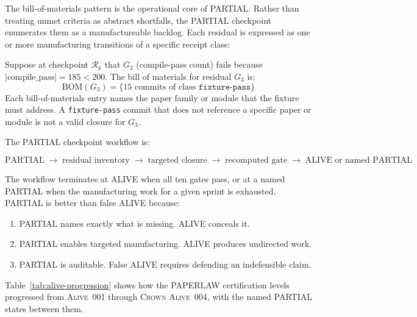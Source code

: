 The bill-of-materials pattern is the operational core of PARTIAL. Rather than treating
unmet criteria as abstract shortfalls, the PARTIAL checkpoint enumerates them as a
manufactureable backlog. Each residual is expressed as one or more manufacturing
transitions of a specific receipt class:

\begin{example}
\label{ex:partial-bom}
Suppose at checkpoint $\mathcal{R}_k$ that $G_3$ (compile-pass count) fails because
$|\text{compile\_pass}| = 185 < 200$. The bill of materials for residual $G_3$ is:
\[
  \text{BOM}(G_3) = \{15 \text{ commits of class } \texttt{fixture-pass}\}
\]
Each bill-of-materials entry names the paper family or module that the fixture must
address. A \texttt{fixture-pass} commit that does not reference a specific paper or
module is not a valid closure for $G_3$.
\end{example}

The PARTIAL checkpoint workflow is:

\[
  \text{PARTIAL} \;\to\; \text{residual inventory} \;\to\; \text{targeted closure}
  \;\to\; \text{recomputed gate} \;\to\; \text{ALIVE} \;\text{or named PARTIAL}
\]

The workflow terminates at ALIVE when all ten gates pass, or at a named PARTIAL when the
manufacturing work for a given sprint is exhausted. PARTIAL is better than false ALIVE
because:

\begin{enumerate}
  \item PARTIAL names exactly what is missing. ALIVE conceals it.
  \item PARTIAL enables targeted manufacturing. ALIVE produces undirected work.
  \item PARTIAL is auditable. False ALIVE requires defending an indefensible claim.
\end{enumerate}

Table~\ref{tab:alive-progression} shows how the PAPERLAW certification levels progressed
from \textsc{Alive~001} through \textsc{Crown Alive~004}, with the named PARTIAL states
between them.

